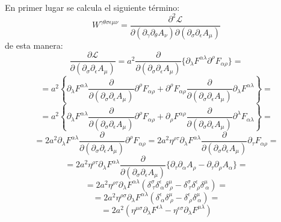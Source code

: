 \documentclass[a4paper,12pt]{article}
\begin{document}
\\

En primer lugar se calcula el siguiente término:
\begin{equation}
W^{\gamma\theta\sigma\epsilon\mu\nu}= \frac{\partial^2\mathscr{L} }{\partial( \partial_\gamma\partial_\theta A_\nu)\partial(\partial_{\sigma}\partial_{\epsilon} A_\mu)}
\end{equation}
de esta manera:
\begin{equation}
\frac{\partial \mathscr{L} }{\partial(\partial_{\sigma}\partial_{\epsilon} A_\mu)}=a^2\frac{\partial  }{\partial(\partial_{\sigma}\partial_{\epsilon} A_\mu)}\{\partial_\lambda F^{\alpha\lambda}\partial^\rho F_{\alpha\rho} \}=
\label{segder}
\end{equation} 
$$=a^2\left\{\partial_\lambda F^{\alpha\lambda}\frac{\partial  }{\partial(\partial_{\sigma}\partial_{\epsilon} A_\mu)}\partial^\rho F_{\alpha\rho}+\partial^\rho F_{\alpha\rho}\frac{\partial  }{\partial(\partial_{\sigma}\partial_{\epsilon} A_\mu)}\partial_\lambda F^{\alpha\lambda}\right\}=$$
$$=a^2\left\{\partial_\lambda F^{\alpha\lambda}\frac{\partial  }{\partial(\partial_{\sigma}\partial_{\epsilon} A_\mu)}\partial^\rho F_{\alpha\rho}+\partial_\rho F^{\alpha\rho}\frac{\partial  }{\partial(\partial_{\sigma}\partial_{\epsilon} A_\mu)}\partial^\lambda F_{\alpha\lambda}\right\}=$$
$$=2a^2\partial_\lambda F^{\alpha\lambda}\frac{\partial  }{\partial(\partial_{\sigma}\partial_{\epsilon} A_\mu)}\partial^\rho F_{\alpha\rho}=2a^2\eta^{\rho\tau}\partial_\lambda F^{\alpha\lambda}\frac{\partial  }{\partial(\partial_{\sigma}\partial_{\epsilon} A_\mu)}\partial_\tau F_{\alpha\rho}=$$
$$=2a^2\eta^{\rho\tau}\partial_\lambda F^{\alpha\lambda}\frac{\partial  }{\partial(\partial_{\sigma}\partial_{\epsilon} A_\mu)}\{\partial_\tau\partial_\alpha A_\rho-\partial_\tau\partial_\rho A_\alpha\}=$$
$$=2a^2\eta^{\rho\tau}\partial_\lambda F^{\alpha\lambda}(\delta_{\ \tau}^\sigma\delta^\epsilon_{\ \alpha}\delta^\mu_{\ \rho}-\delta_{\ \tau}^\sigma\delta_{\ \rho}^\epsilon\delta_{\ \alpha}^\mu)=$$
$$=2a^2\eta^{\rho\sigma}\partial_\lambda F^{\alpha\lambda}(\delta^\epsilon_{\ \alpha}\delta^\mu_{\ \rho}-\delta_{\ \rho}^\epsilon\delta_{\ \alpha}^\mu)=$$
$$=2a^2(\eta^{\mu\sigma}\partial_\lambda F^{\epsilon\lambda}-\eta^{\epsilon\sigma}\partial_\lambda F^{\mu\lambda})$$
\end{document}
